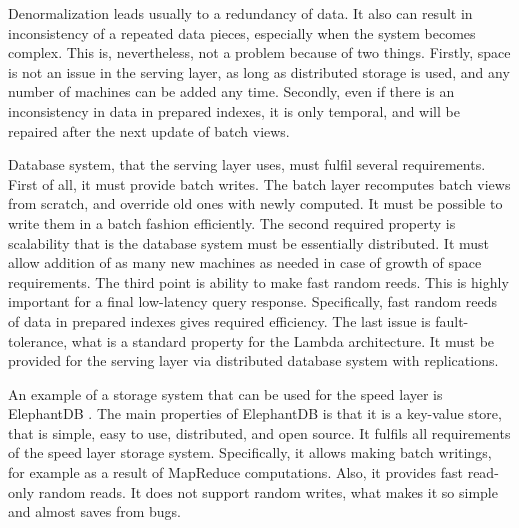 Denormalization leads usually to a redundancy of data.
It also can result in inconsistency of a repeated data pieces, especially when the system becomes complex.
This is, nevertheless, not a problem because of two things.
Firstly, space is not an issue in the serving layer, as long as distributed storage is used, and any number of machines can be added any time.
Secondly, even if there is an inconsistency in data in prepared indexes, it is only temporal, and will be repaired after the next update of batch views.

Database system, that the serving layer uses, must fulfil several requirements.
First of all, it must provide batch writes.
The batch layer recomputes batch views from scratch, and override old ones with newly computed.
It must be possible to write them in a batch fashion efficiently.
The second required property is scalability that is the database system must be essentially distributed.
It must allow addition of as many new machines as needed in case of growth of space requirements.
The third point is ability to make fast random reeds.
This is highly important for a final low-latency query response.
Specifically, fast random reeds of data in prepared indexes gives required efficiency.
The last issue is fault-tolerance, what is a standard property for the Lambda architecture.
It must be provided for the serving layer via distributed database system with replications.

An example of a storage system that can be used for the speed layer is ElephantDB \cite{ElephantDB, Macbeth2013}.
The main properties of ElephantDB is that it is a key-value store, that is simple, easy to use, distributed, and open source.
It fulfils all requirements of the speed layer storage system.
Specifically, it allows making batch writings, for example as a result of MapReduce computations.
Also, it provides fast read-only random reads.
It does not support random writes, what makes it so simple and almost saves from bugs.